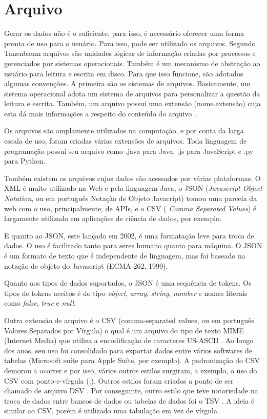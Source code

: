 \documentclass[
	12pt,				%
	openright,			%
	oneside,			%
	a4paper,			%
	english,			%
	brazil				%
	]{abntex2}
\begin{document}
	\section{Arquivo}
		Gerar os dados não é o suficiente, para isso, é necessário oferecer uma forma pronta de uso para o usuário.
		Para isso, pode ser utilizado os arquivos.
		Segundo Tanenbaum arquivos são unidades lógicas de informação criadas por processos e gerenciados por sistemas operacionais.
		Também é um mecanismo de abstração ao usuário para leitura e escrita em disco.
		Para que isso funcione, são adotados algumas convenções.
		A primeira são os sistemas de arquivos.
		Basicamente, um sistema operacional adota um sistema de arquivos para personalizar a questão da leitura e escrita.
		Também, um arquivo possui uma extensão (nome.extensão) cuja esta dá mais informações a respeito do conteúdo do arquivo \cite{tanenbaum1995sistemas}.
		\par
		Os arquivos são amplamente utilizados na computação, e por conta da larga escala de uso, foram criadas várias extensões de arquivos.
		Toda linguagem de programação possui seu arquivo como .java para Java, .js para JavaScript e .py para Python.
		\par
		Também existem os arquivos cujos dados são acessados por várias plataformas. O XML é muito utilizado na Web e pela linguagem Java, o JSON (\emph{Javascript Object Notation}, ou em português Notação de Objeto Javacript) tomou uma parcela da web com o uso, principalmente, de APIs, e o CSV ( \emph{Comma Separated Values}) é largamente utilizado em aplicações de ciência de dados, por exemplo.
        \par
		E quanto ao JSON, \cite{json-rfc-8259} \cite{json-jsonOrg} este lançado em 2002, é uma formatação leve para troca de dados. 
		O uso é facilitado tanto para seres humano quanto para máquina.
		O JSON é um formato de texto que é independente de linguagem, mas foi baseado na notação de objeto do Javascript (ECMA-262, 1999).
		\par
		Quanto aos tipos de dados suportados, o JSON \cite{json-rfc-8259} é uma sequência de tokens. 
		Os tipos de tokens aceitos é do tipo \textit{object}, \textit{array}, \textit{string}, \textit{number} e nomes literais como \textit{false}, \textit{true} e \textit{null}.
		\par
		Outra extensão de arquivo é o CSV \cite{csv-rfc-4180} (comma-separated values, ou em português Valores Separados por Vírgula) o qual é um arquivo do tipo de texto MIME (Internet Media) \cite{mime-rfc-2048} que utiliza a encodificação de caracteres US-ASCII \cite{csv-rfc-7111}.
		Ao longo dos anos, seu uso foi consolidado para exportar dados entre vários softwares de tabelas (Microsoft suíte para Apple Suíte, por exemplo).
		A padronização do CSV demorou a ocorrer e por isso, vários outros estilos surgiram, a exemplo, o uso do CSV com ponto-e-vírgula (;).
		Outros estilos foram criados a ponto de ser chamado de arquivo DSV \cite{dsv}.
		Por conseguinte, outro estilo que teve notoriedade na troca de dados entre bancos de dados ou tabelas de dados foi o TSV \cite{tsv-iana}.
		A ideia é similar ao CSV, porém é utilizado uma tabulação em vez de vírgula.
		
\end{document}
